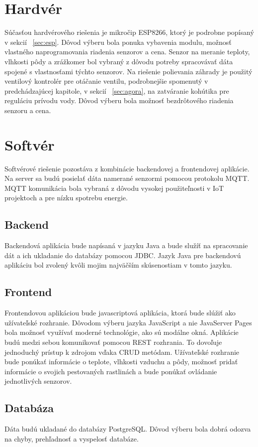 \documentclass[twoside]{ctuthesis}
\theoremstyle{plain}
\theoremstyle{definition}
\theoremstyle{note}
\begin{document}
\section{Hardvér}
 Súčasťou hardvérového riešenia je mikročip ESP8266, ktorý je podrobne popísaný v sekcií ~\ref{sec:esp}. Dôvod výberu bola ponuka vybavenia modulu, možnosť vlastného naprogramovania riadenia senzorov a cena. Senzor na meranie teploty, vlhkosti pôdy a zrážkomer bol vybraný z dôvodu potreby spracovávať dáta spojené s vlastnosťami týchto senzorov. Na riešenie polievania záhrady je použitý ventilový kontrolér pre otáčanie ventilu, podrobnejšie spomenutý v predchádzajúcej kapitole, v sekcií ~\ref{sec:agora}, na zatváranie kohútika pre reguláciu prívodu vody. Dôvod výberu bola možnosť bezdrôtového riadenia senzoru a cena. 
 
\section{Softvér}
\label{sec:software}
Softvérové riešenie pozostáva z kombinácie backendovej a frontendovej aplikácie.
Na server sa budú posielať dáta namerané senzormi pomocou protokolu MQTT. MQTT komunikácia bola vybraná z dôvodu vysokej použiteľnosti v IoT projektoch a pre nízku spotrebu energie. 

\subsection{Backend}
Backendová aplikácia bude napísaná v jazyku Java a bude služíť na spracovanie dát a ich ukladanie do databázy pomocou JDBC. Jazyk Java pre backendovú aplikáciu bol zvolený kvôli mojim najväčším skúsenostiam v tomto jazyku.

\subsection{Frontend}
Frontendovou aplikáciou bude javascriptová aplikácia, ktorá bude slúžiť ako užívateľské rozhranie. Dôvodom výberu jazyka JavaScript a nie JavaServer Pages bola možnosť využívať moderné technológie, ako sú modálne okná.  Aplikácie budú medzi sebou komunikovať pomocou REST rozhrania. To dovoľuje jednoduchý prístup k zdrojom vďaka CRUD metódam. Užívateľské rozhranie bude ponúkať informácie o teplote, vlhkosti vzduchu a pôdy, možnosť pridať informácie o svojich pestovaných rastlinách a bude ponúkať ovládanie jednotlivých senzorov.

\subsection{Databáza}
Dáta budú ukladané do databázy PostgreSQL. Dôvod výberu bola dobrá odozva na chyby, prehľadnosť a vyspelosť databáze.
\end{document}
